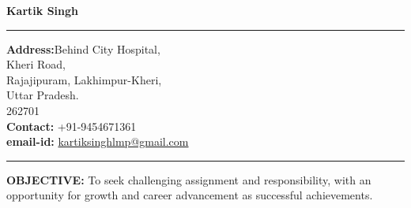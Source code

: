 \documentclass[10pt]{article}
\begin{document}
	\large
	{\Huge\noindent\hspace*{200pt}\textbf{Kartik Singh}}
	\vspace{.5cm}
	\hrule
	\begin{minipage}{0.4\textwidth}
		\begin{flushleft}
			\textbf{Address:}Behind City Hospital,\\
			Kheri Road,\\
			Rajajipuram, Lakhimpur-Kheri,\\
			Uttar Pradesh.\\
			262701 \\
			\textbf{Contact:} +91-9454671361\\
			\textbf{email-id:} \href{mailto: kartiksinghlmp@gmail.com}{kartiksinghlmp@gmail.com}
		\end{flushleft}
	\end{minipage}
	\hfill
	\begin{minipage}{0.4\textwidth}
		\begin{flushright}
		\end{flushright}
	\end{minipage}
	\hrule
	\vspace{0.5cm}
	\par{\Large\noindent\textbf{OBJECTIVE:}} 
	To seek challenging assignment and responsibility, with an opportunity for growth and career advancement as successful achievements.
	
\end{document}
